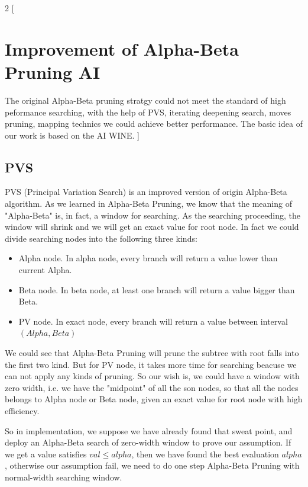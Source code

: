 \documentclass[a4paper, 12pt]{article} %
\begin{document}
	\begin{multicols}{2}
		[
		\section{Improvement of Alpha-Beta Pruning AI}
		The original Alpha-Beta pruning stratgy could not meet the standard of high peformance searching, with the help of PVS, iterating deepening search, moves pruning, mapping technics we could achieve better performance. The basic idea of our work is based on the AI WINE.
		]

		\subsection{PVS}
		
		PVS (Principal Variation Search) is an improved version of origin Alpha-Beta algorithm. As we learned in Alpha-Beta Pruning, we know that the meaning of "Alpha-Beta" is, in fact, a window for searching. As the searching proceeding, the window will shrink and we will get an exact value for root node. In fact we could divide searching nodes into the following three kinds:
		
		\begin{itemize}
			\item Alpha node. In alpha node, every branch will return a value lower than current Alpha.
			\item Beta node. In beta node, at least one branch will return a value bigger than Beta.
			\item PV node. In exact node, every branch will return a value between interval $(Alpha, Beta)$
		\end{itemize}
	
		We could see that Alpha-Beta Pruning will prune the subtree with root falls into the first two kind. But for PV node, it takes more time for searching beacuse we can not apply any kinds of pruning. So our wish is, we could have a window with zero width, i.e. we have the "midpoint" of all the son nodes, so that all the nodes belongs to Alpha node or Beta node, given an exact value for root node with high efficiency.
		
		So in implementation, we suppose we have already found that sweat point, and deploy an Alpha-Beta search of zero-width window to prove our assumption. If we get a value satisfies $val \leq alpha$, then we have found the best evaluation $alpha$, otherwise our assumption fail, we need to do one step Alpha-Beta Pruning with normal-width searching window. 
		

\end{multicols}
\end{document}
